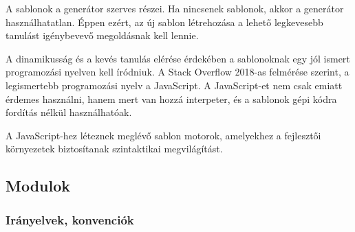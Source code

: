 \documentclass[a4paper,12pt,oneside]{report}
\begin{document}
\begin{justify}

	A sablonok a generátor szerves részei. Ha nincsenek sablonok, akkor a generátor használhatatlan. Éppen ezért, az új sablon létrehozása a lehető legkevesebb tanulást igénybevevő megoldásnak kell lennie. 

	A dinamikusság és a kevés tanulás elérése érdekében a sablonoknak egy jól ismert programozási nyelven kell íródniuk. A Stack Overflow 2018-as felmérése szerint, a legismertebb programozási nyelv a JavaScript. \cite{website:most_known_language} A JavaScript-et nem csak emiatt érdemes használni, hanem mert van hozzá interpeter, és a sablonok gépi kódra fordítás nélkül használhatóak.

	A JavaScript-hez léteznek meglévő sablon motorok, amelyekhez a fejlesztői környezetek biztosítanak szintaktikai megvilágítást.


\end{justify}

\newpage
\subsection{Modulok}
\subsubsection{Irányelvek, konvenciók}
\end{document}
